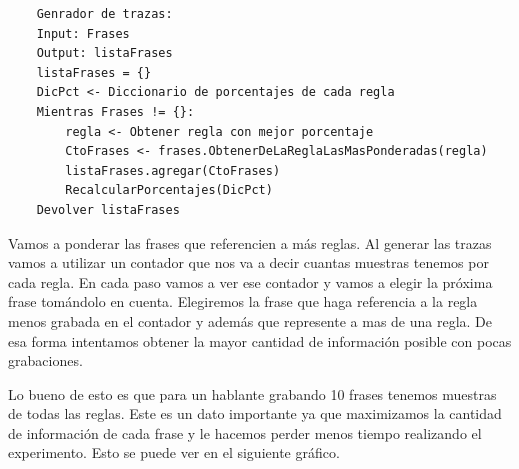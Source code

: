 \documentclass[11pt,a4paper,twoside]{tesis}
\begin{document}
\begin{lstlisting}
    Genrador de trazas:
    Input: Frases
    Output: listaFrases 
    listaFrases = {}
    DicPct <- Diccionario de porcentajes de cada regla
    Mientras Frases != {}:
    	regla <- Obtener regla con mejor porcentaje
    	CtoFrases <- frases.ObtenerDeLaReglaLasMasPonderadas(regla)
    	listaFrases.agregar(CtoFrases)
    	RecalcularPorcentajes(DicPct)
    Devolver listaFrases
\end{lstlisting}

Vamos a ponderar las frases que referencien a más reglas. Al generar las trazas vamos a utilizar un contador que nos va a decir cuantas muestras tenemos por cada regla. En cada paso vamos a ver ese contador y vamos a elegir la próxima frase tomándolo en cuenta. Elegiremos la frase que haga referencia a la regla menos grabada en el contador y además que represente a mas de una regla. De esa forma intentamos obtener la mayor cantidad de información posible con pocas grabaciones.

Lo bueno de esto es que para un hablante grabando 10 frases tenemos muestras de todas las reglas. Este es un dato importante ya que maximizamos la cantidad de información de cada frase y le hacemos perder menos tiempo realizando el experimento. Esto se puede ver en el siguiente gráfico.
\end{document}
